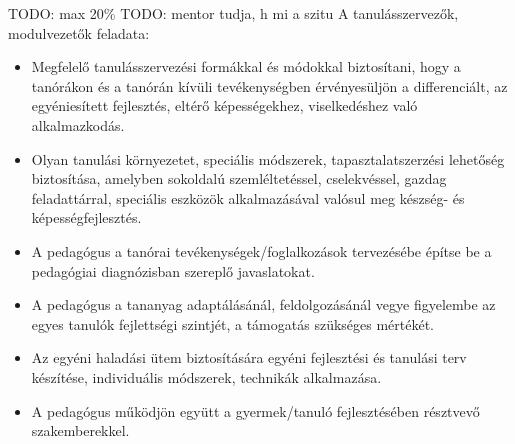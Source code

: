 TODO: max 20\% TODO: mentor tudja, h mi a szitu
A tanulásszervezők, modulvezetők feladata:

\begin{itemize}
  \item
        Megfelelő tanulásszervezési formákkal és módokkal biztosítani, hogy a
        tanórákon és a tanórán kívüli tevékenységben érvényesüljön a
        differenciált, az egyéniesített fejlesztés, eltérő képességekhez,
        viselkedéshez való alkalmazkodás.
  \item
        Olyan tanulási környezetet, speciális módszerek, tapasztalatszerzési
        lehetőség biztosítása, amelyben sokoldalú szemléltetéssel,
        cselekvéssel, gazdag feladattárral, speciális eszközök alkalmazásával
        valósul meg készség- és képességfejlesztés.
  \item
        A pedagógus a tanórai tevékenységek/foglalkozások tervezésébe építse
        be a pedagógiai diagnózisban szereplő javaslatokat.
  \item
        A pedagógus a tananyag adaptálásánál, feldolgozásánál vegye figyelembe
        az egyes tanulók fejlettségi szintjét, a támogatás szükséges mértékét.
  \item
        Az egyéni haladási ütem biztosítására egyéni fejlesztési és tanulási
        terv készítése, individuális módszerek, technikák alkalmazása.
  \item
        A pedagógus működjön együtt a gyermek/tanuló fejlesztésében résztvevő
        szakemberekkel.
\end{itemize}